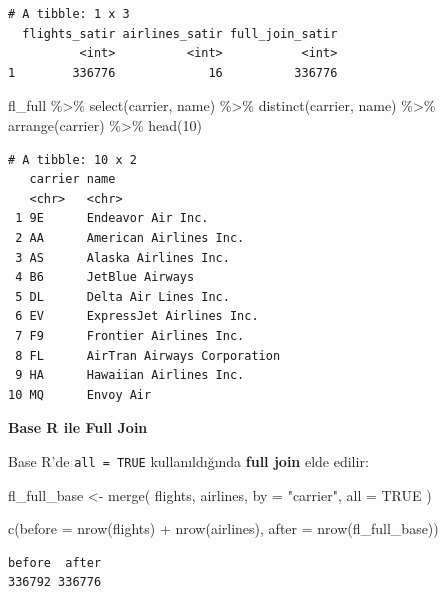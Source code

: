 \documentclass[
  letterpaper,
  DIV=11,
  numbers=noendperiod]{scrreprt}
\newenvironment{Shaded}{\begin{snugshade}}{\end{snugshade}}
\newcommand{\AttributeTok}[1]{\textcolor[rgb]{0.40,0.45,0.13}{#1}}
\newcommand{\ConstantTok}[1]{\textcolor[rgb]{0.56,0.35,0.01}{#1}}
\newcommand{\DecValTok}[1]{\textcolor[rgb]{0.68,0.00,0.00}{#1}}
\newcommand{\FunctionTok}[1]{\textcolor[rgb]{0.28,0.35,0.67}{#1}}
\newcommand{\NormalTok}[1]{\textcolor[rgb]{0.00,0.23,0.31}{#1}}
\newcommand{\OtherTok}[1]{\textcolor[rgb]{0.00,0.23,0.31}{#1}}
\newcommand{\SpecialCharTok}[1]{\textcolor[rgb]{0.37,0.37,0.37}{#1}}
\newcommand{\StringTok}[1]{\textcolor[rgb]{0.13,0.47,0.30}{#1}}
\begin{document}
\begin{verbatim}
# A tibble: 1 x 3
  flights_satir airlines_satir full_join_satir
          <int>          <int>           <int>
1        336776             16          336776
\end{verbatim}

\begin{Shaded}
\begin{Highlighting}[]
\NormalTok{fl\_full }\SpecialCharTok{\%\textgreater{}\%}
\FunctionTok{select}\NormalTok{(carrier, name) }\SpecialCharTok{\%\textgreater{}\%}
\FunctionTok{distinct}\NormalTok{(carrier, name) }\SpecialCharTok{\%\textgreater{}\%}
\FunctionTok{arrange}\NormalTok{(carrier) }\SpecialCharTok{\%\textgreater{}\%}
\FunctionTok{head}\NormalTok{(}\DecValTok{10}\NormalTok{)}
\end{Highlighting}
\end{Shaded}

\begin{verbatim}
# A tibble: 10 x 2
   carrier name                       
   <chr>   <chr>                      
 1 9E      Endeavor Air Inc.          
 2 AA      American Airlines Inc.     
 3 AS      Alaska Airlines Inc.       
 4 B6      JetBlue Airways            
 5 DL      Delta Air Lines Inc.       
 6 EV      ExpressJet Airlines Inc.   
 7 F9      Frontier Airlines Inc.     
 8 FL      AirTran Airways Corporation
 9 HA      Hawaiian Airlines Inc.     
10 MQ      Envoy Air                  
\end{verbatim}

\textbf{Base R ile Full Join}

Base R'de \texttt{all\ =\ TRUE} kullanıldığında \textbf{full join} elde
edilir:

\begin{Shaded}
\begin{Highlighting}[]
\NormalTok{fl\_full\_base }\OtherTok{\textless{}{-}} \FunctionTok{merge}\NormalTok{(}
\NormalTok{flights,}
\NormalTok{airlines,}
\AttributeTok{by =} \StringTok{"carrier"}\NormalTok{,}
\AttributeTok{all =} \ConstantTok{TRUE}
\NormalTok{)}

\FunctionTok{c}\NormalTok{(}\AttributeTok{before =} \FunctionTok{nrow}\NormalTok{(flights) }\SpecialCharTok{+} \FunctionTok{nrow}\NormalTok{(airlines), }\AttributeTok{after =} \FunctionTok{nrow}\NormalTok{(fl\_full\_base))}
\end{Highlighting}
\end{Shaded}

\begin{verbatim}
before  after 
336792 336776 
\end{verbatim}
\end{document}
